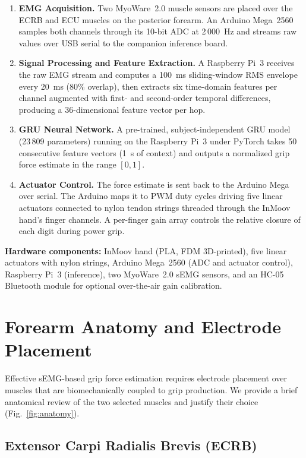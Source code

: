 \documentclass[journal]{IEEEtran}
\begin{document}
\begin{enumerate}
\item \textbf{EMG Acquisition.}  Two MyoWare~2.0 muscle sensors are placed
  over the ECRB and ECU muscles on the posterior forearm.  An Arduino
  Mega~2560 samples both channels through its 10-bit ADC at 2\,000~Hz and
  streams raw values over USB serial to the companion inference board.
\item \textbf{Signal Processing and Feature Extraction.}  A Raspberry
  Pi~3 receives the raw EMG stream and computes a 100~ms sliding-window
  RMS envelope every 20~ms (80\% overlap), then extracts six time-domain
  features per channel augmented with first- and second-order temporal
  differences, producing a 36-dimensional feature vector per hop.
\item \textbf{GRU Neural Network.}  A pre-trained, subject-independent GRU
  model (23\,809 parameters) running on the Raspberry Pi~3 under PyTorch
  takes 50 consecutive feature vectors (1~s of context) and outputs a
  normalized grip force estimate in the range $[0, 1]$.
\item \textbf{Actuator Control.}  The force estimate is sent back to the
  Arduino Mega over serial.  The Arduino maps it to PWM duty cycles driving
  five linear actuators connected to nylon tendon strings threaded through
  the InMoov hand's finger channels.  A per-finger gain array controls the
  relative closure of each digit during power grip.
\end{enumerate}

\noindent\textbf{Hardware components:}
InMoov hand (PLA, FDM 3D-printed), five linear actuators with nylon
strings, Arduino Mega~2560 (ADC and actuator control), Raspberry Pi~3
(inference), two MyoWare~2.0 sEMG sensors, and an HC-05 Bluetooth module
for optional over-the-air gain calibration.

\section{Forearm Anatomy and Electrode Placement}
\label{sec:anatomy}

Effective sEMG-based grip force estimation requires electrode placement
over muscles that are biomechanically coupled to grip production.  We
provide a brief anatomical review of the two selected muscles and
justify their choice (Fig.~\ref{fig:anatomy}).

\subsection{Extensor Carpi Radialis Brevis (ECRB)}
\end{document}
